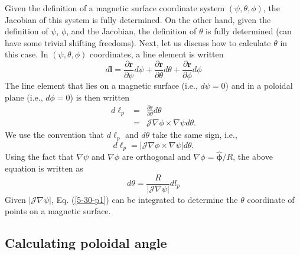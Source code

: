 \documentclass{llncs}
\newcommand{\tmmathbf}[1]{\ensuremath{\boldsymbol{#1}}}
\begin{document}
Given the definition of a magnetic surface coordinate system $(\psi, \theta,
\phi)$, the Jacobian of this system is fully determined. On the other hand,
given the definition of $\psi$, $\phi$, and the Jacobian, the definition of
$\theta$ is fully determined (can have some trivial shifting freedoms). Next,
let us discuss how to calculate $\theta$ in this case. In $(\psi, \theta,
\phi)$ coordinates, a line element is written
\begin{equation}
  \label{17-11-6-p1} d\mathbf{l}= \frac{\partial \mathbf{r}}{\partial \psi} d
  \psi + \frac{\partial \mathbf{r}}{\partial \theta} d \theta + \frac{\partial
  \mathbf{r}}{\partial \phi} d \phi
\end{equation}
The line element that lies on a magnetic surface (i.e., $d \psi = 0$) and in a
poloidal plane (i.e., $d \phi = 0$) is then written
\begin{eqnarray}
  d\tmmathbf{\ell}_p & = & \frac{\partial \mathbf{r}}{\partial \theta} d
  \theta \nonumber\\
  & = & \mathcal{J} \nabla \phi \times \nabla \psi d \theta . 
\end{eqnarray}
We use the convention that $d \ell_p$ and $d \theta$ take the same sign, i.e.,
\begin{equation}
  d \ell_p = | \mathcal{J} \nabla \phi \times \nabla \psi | d \theta .
\end{equation}
Using the fact that $\nabla \psi$ and $\nabla \phi$ are orthogonal and $\nabla
\phi = \hat{\tmmathbf{\phi}} / R$, the above equation is written as
\begin{equation}
  \label{5-30-p1} d \theta = \frac{R}{|\mathcal{J} \nabla \psi |} d l_p
\end{equation}
Given $|\mathcal{J} \nabla \psi |$, Eq. (\ref{5-30-p1}) can be integrated to
determine the $\theta$ coordinate of points on a magnetic surface.

\subsection{Calculating poloidal angle}
\end{document}

